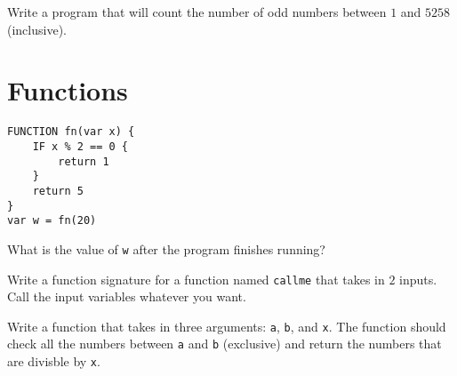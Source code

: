 \documentclass{article}
\begin{document}
\begin{Exercise}

Write a program that will count the number of odd numbers between $1$ and $5258$ (inclusive).

\end{Exercise}

\section{Functions}

\begin{Exercise}
\begin{lstlisting}[caption={Pseudocode.}, label={code:exercise_fn_1},mathescape]
FUNCTION fn(var x) {
    IF x % 2 == 0 {
        return 1
    }
    return 5
}
var w = fn(20)
\end{lstlisting}

What is the value of \lstinline{w} after the program finishes running?

\end{Exercise}

\begin{Exercise}

Write a function signature for a function named \lstinline{callme} that takes in $2$ inputs.
Call the input variables whatever you want.

\end{Exercise}

\begin{Exercise}

Write a function that takes in three arguments: \lstinline{a}, \lstinline{b}, and \lstinline{x}.
The function should check all the numbers between \lstinline{a} and \lstinline{b} (exclusive) and return the numbers that are divisble by \lstinline{x}.

\end{Exercise}
\end{document}
